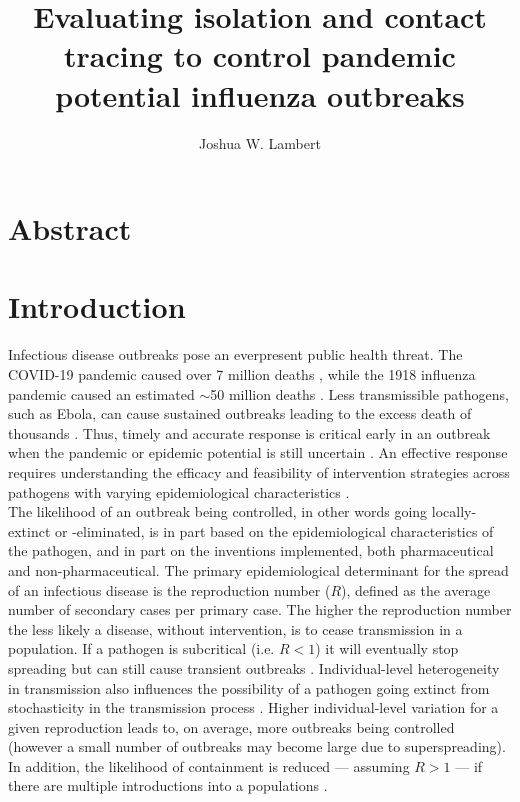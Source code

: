 \documentclass{article}
\title{Evaluating isolation and contact tracing to control pandemic potential influenza outbreaks}
\author{Joshua W. Lambert}
\date{}
\begin{document}
\maketitle

\section*{Abstract}

\section*{Introduction}

Infectious disease outbreaks pose an everpresent public health threat. The COVID-19 pandemic caused over 7 million deaths \citep{whocovid-19dashboardCOVID19DeathsWHO}, while the 1918 influenza pandemic caused an estimated $\sim$50 million deaths \citep{johnsonUpdatingAccountsGlobal2002}. Less transmissible pathogens, such as Ebola, can cause sustained outbreaks leading to the excess death of thousands \citep{whoebolaresponseteamEbolaVirusDisease2014}. Thus, timely and accurate response is critical early in an outbreak when the pandemic or epidemic potential is still uncertain \citep{kucharskiControllingMinorOutbreaks2024}. An effective response requires understanding the efficacy and feasibility of intervention strategies across pathogens with varying epidemiological characteristics \citep{fraserFactorsThatMake2004}. \\

The likelihood of an outbreak being controlled, in other words going locally-extinct or -eliminated, is in part based on the epidemiological characteristics of the pathogen, and in part on the inventions implemented, both pharmaceutical and non-pharmaceutical. The primary epidemiological determinant for the spread of an infectious disease is the reproduction number ($R$), defined as the average number of secondary cases  per primary case. The higher the reproduction number the less likely a disease, without intervention, is to cease transmission in a population. If a pathogen is subcritical (i.e. $R < 1$) it will eventually stop spreading but can still cause transient outbreaks \citep{farringtonDistributionTimeExtinction1999}. Individual-level heterogeneity in transmission also influences the possibility of a pathogen going extinct from stochasticity in the transmission process \citep{lloyd-smithSuperspreadingEffectIndividual2005}. Higher individual-level variation for a given reproduction leads to, on average, more outbreaks being controlled (however a small number of outbreaks may become large due to superspreading). In addition, the likelihood of containment is reduced --- assuming $R > 1$ --- if there are multiple introductions into a populations \citep{kucharskiEarlyDynamicsTransmission2020}. \\
\end{document}
